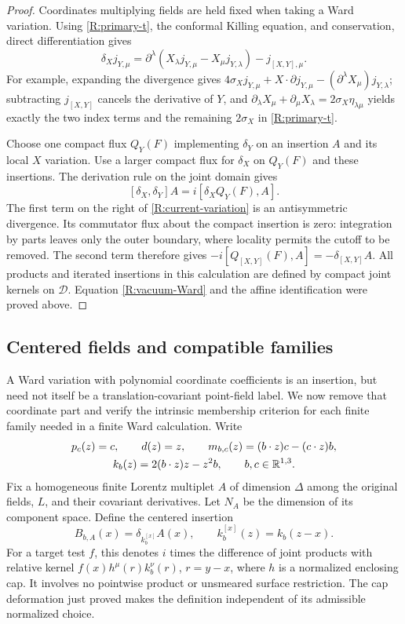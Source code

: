 \begin{proof}
Coordinates multiplying fields are held fixed when taking a Ward
variation.  Using \eqref{R:primary-t}, the conformal Killing equation,
and conservation, direct differentiation gives
\begin{equation}\label{R:current-variation}
 \delta_X j_{Y,\mu}
  =\partial^\lambda(X_\lambda j_{Y,\mu}
                              -X_\mu j_{Y,\lambda})
       -j_{[X,Y],\mu}.
\end{equation}
For example, expanding the divergence gives
$4\sigma_X j_{Y,\mu}+X\cdot\partial j_{Y,\mu}
-(\partial^\lambda X_\mu)j_{Y,\lambda}$; subtracting
$j_{[X,Y]}$ cancels the derivative of $Y$, and
$\partial_\lambda X_\mu+\partial_\mu X_\lambda
=2\sigma_X\eta_{\lambda\mu}$ yields exactly the two index terms
and the remaining $2\sigma_X$ in \eqref{R:primary-t}.

Choose one compact flux $Q_Y(F)$ implementing $\delta_Y$ on an
insertion $A$ and its local $X$ variation.  Use a larger compact
flux for $\delta_X$ on $Q_Y(F)$ and these insertions.  The derivation
rule on the joint domain gives
\[
 [\delta_X,\delta_Y]A=i[\delta_X Q_Y(F),A].
\]
The first term on the right of \eqref{R:current-variation} is an
antisymmetric divergence.  Its commutator flux about the compact
insertion is zero: integration by parts leaves only the outer
boundary, where locality permits the cutoff to be removed.
The second term therefore gives
$-i[Q_{[X,Y]}(F),A]=-\delta_{[X,Y]}A$.
All products and iterated insertions in this calculation are defined
by compact joint kernels on $\mathcal D$.  Equation
\eqref{R:vacuum-Ward} and the affine identification were proved
above.
\end{proof}

\subsection{Centered fields and compatible families}

A Ward variation with polynomial coordinate coefficients is an insertion,
but need not itself be a translation-covariant point-field label.  We now
remove that coordinate part and verify the intrinsic membership criterion
for each finite family needed in a finite Ward calculation.  Write
\[
 \begin{gathered}
 p_c(z)=c,\qquad d(z)=z,\qquad
 m_{b,c}(z)=(b\cdot z)c-(c\cdot z)b,\\
 k_b(z)=2(b\cdot z)z-z^2b,\qquad b,c\in\mathbb R^{1,3}.
 \end{gathered}
\]
Fix a homogeneous finite Lorentz multiplet $A$ of dimension $\Delta$
among the original fields, $L$, and their covariant derivatives.
Let $N_A$ be the dimension of its component space.  Define the centered insertion
\[
 B_{b,A}(x)=\delta_{k_b^{[x]}}A(x),\qquad
 k_b^{[x]}(z)=k_b(z-x).
\]
For a target test $f$, this denotes $i$ times the difference of joint products
with relative kernel $f(x)h^\mu(r)k_b^\nu(r)$, $r=y-x$, where $h$ is a
normalized enclosing cap.  It involves no pointwise product or
unsmeared surface restriction.  The cap deformation just proved makes
the definition independent of its admissible normalized choice.

